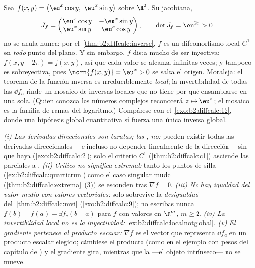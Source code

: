 \begin{example}\label{ex:b2:diffcalc:localnotglobal}
Sea $f(x, y) = \bigl(\eu^x\cos y,\ \eu^x\sin y\bigr)$ sobre $\R^2$.
Su jacobiana,
\[
J_f = \begin{pmatrix}
\eu^x\cos y & -\eu^x\sin y\\
\eu^x\sin y & \eu^x\cos y
\end{pmatrix},
\qquad
\det J_f = \eu^{2x} > 0 ,
\]
no se anula nunca: por el~\cref{thm:b2:diffcalc:inverse}, $f$ es un
difeomorfismo local $C^1$ en \emph{todo} punto del plano. Y sin
embargo, $f$ dista mucho de ser inyectiva: $f(x, y + 2\pi) = f(x,
y)$, así que cada valor se alcanza infinitas veces; y tampoco es
sobreyectiva, pues $\norm{f(x, y)} = \eu^x > 0$ se salta el origen.
Moraleja: el teorema de la función inversa es irreduciblemente
\emph{local}; la invertibilidad de todas las $\dd f_a$ rinde un
mosaico de inversas locales que no tiene por qué ensamblarse en una
sola. (Quien conozca los números complejos reconocerá $z \mapsto
\eu^z$; el mosaico es la familia de ramas del logaritmo.) Compárese
con el~\cref{exo:b2:diffcalc:12}, donde una hipótesis global
cuantitativa sí fuerza una única inversa global.
\end{example}

\begin{remark}
\emph{(i) Las derivadas direccionales son baratas; las
, no:} pueden existir todas las derivadas
direccionales ---e incluso no depender linealmente de la
dirección--- sin que haya 
(\cref{exo:b2:diffcalc:2}); solo el criterio $C^1$
(\cref{thm:b2:diffcalc:c1}) asciende las parciales a
. \emph{(ii) Crítico no significa extremal:} tanto los
puntos de silla (\cref{ex:b2:diffcalc:quarticrun}) como el caso
singular mudo (\cref{thm:b2:diffcalc:extrema}~(3)) se esconden tras
$\nabla f = 0$. \emph{(iii) No hay igualdad del valor medio con
valores vectoriales:} solo sobrevive la \emph{desigualdad} del~\cref{thm:b2:diffcalc:mvi} (\cref{exo:b2:diffcalc:9}); no escribas
nunca $f(b) - f(a) = \dd f_c(b-a)$ para $f$ con valores en $\R^m$,
$m \geq 2$. \emph{(iv) La invertibilidad local no es la
inyectividad:} \cref{ex:b2:diffcalc:localnotglobal}. \emph{(v) El
gradiente pertenece al producto escalar:} $\nabla f$ es el vector que
representa $\dd f_a$ en un producto escalar elegido; cámbiese el
producto (como en el ejemplo con pesos del capítulo de ) y el gradiente gira, mientras que la  ---el
objeto intrínseco--- no se mueve.
\end{remark}

